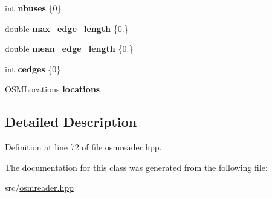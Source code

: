 \begin{DoxyCompactItemize}
\item 
\hypertarget{classjustine_1_1robocar_1_1OSMReader_ac9c3c5b225616c42affc70ad7c166cbf}{int {\bfseries nbuses} \{0\}}\label{classjustine_1_1robocar_1_1OSMReader_ac9c3c5b225616c42affc70ad7c166cbf}

\item 
\hypertarget{classjustine_1_1robocar_1_1OSMReader_ae18da4de7dd3f160bfee6c9617d8dbd2}{double {\bfseries max\-\_\-edge\-\_\-length} \{0.\}}\label{classjustine_1_1robocar_1_1OSMReader_ae18da4de7dd3f160bfee6c9617d8dbd2}

\item 
\hypertarget{classjustine_1_1robocar_1_1OSMReader_a11ccc11ef3622245ab62c71740afa5e2}{double {\bfseries mean\-\_\-edge\-\_\-length} \{0.\}}\label{classjustine_1_1robocar_1_1OSMReader_a11ccc11ef3622245ab62c71740afa5e2}

\item 
\hypertarget{classjustine_1_1robocar_1_1OSMReader_acc08941b57ee58d87dcb9351b936dcfa}{int {\bfseries cedges} \{0\}}\label{classjustine_1_1robocar_1_1OSMReader_acc08941b57ee58d87dcb9351b936dcfa}

\item 
\hypertarget{classjustine_1_1robocar_1_1OSMReader_acf4fd66c1058ee90ad34806e571bb1c1}{O\-S\-M\-Locations {\bfseries locations}}\label{classjustine_1_1robocar_1_1OSMReader_acf4fd66c1058ee90ad34806e571bb1c1}

\end{DoxyCompactItemize}


\subsection{Detailed Description}


Definition at line 72 of file osmreader.\-hpp.



The documentation for this class was generated from the following file\-:\begin{DoxyCompactItemize}
\item 
src/\hyperlink{osmreader_8hpp}{osmreader.\-hpp}\end{DoxyCompactItemize}
